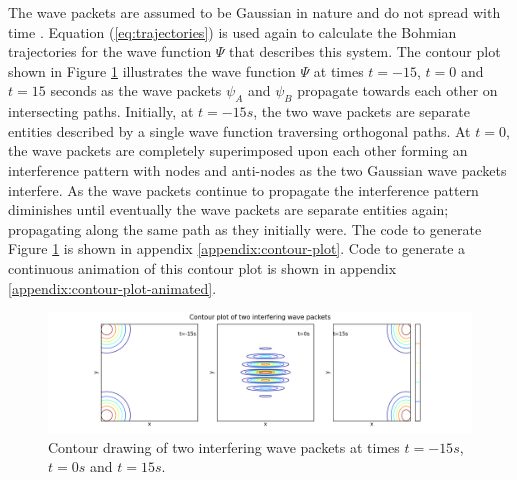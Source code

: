 \documentclass[10pt, reqno]{article}
\begin{document}
  The wave packets are assumed to be Gaussian in nature and do not spread with time \cite{chaloupka}.
  Equation (\ref{eq:trajectories}) is used again to calculate the Bohmian trajectories for the wave function $\Psi$ that describes this system.
  The contour plot shown in Figure \ref{fig:interfering} illustrates the wave function $\Psi$ at times $t=-15$, $t=0$ and $t=15$ seconds 
    as the wave packets $\psi_A$ and $\psi_B$ propagate towards each other on intersecting paths.
  Initially, at $t=-15s$, the two wave packets are separate entities described by a single wave function traversing orthogonal paths.
  At $t=0$, the wave packets are completely superimposed upon each other forming an interference pattern with nodes and anti-nodes as the two Gaussian wave packets interfere.
  As the wave packets continue to propagate the interference pattern diminishes until eventually the wave packets are separate entities again;
    propagating along the same path as they initially were.
  The code to generate Figure \ref{fig:interfering} is shown in appendix \ref{appendix:contour-plot}.
  Code to generate a continuous animation of this contour plot is shown in appendix \ref{appendix:contour-plot-animated}.

  \begin{figure}[!ht]
    \centerline{\includegraphics[width=\paperwidth]{./imgs/contour-plot.png}}
    \caption{
      Contour drawing of two interfering wave packets at times $t=-15s$, $t=0s$ and $t=15s$.
    }
    \label{fig:interfering}
  \end{figure}
\end{document}

